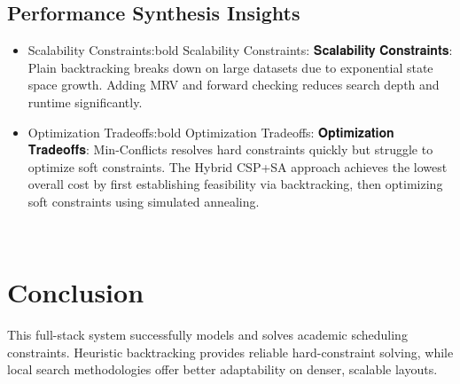 \documentclass[11pt,a4paper]{article}
\begin{document}
\subsection{Performance Synthesis Insights}
\begin{itemize}
\item 

Scalability Constraints:bold Scalability Constraints:
𝐒𝐜𝐚𝐥𝐚𝐛𝐢𝐥𝐢𝐭𝐲 𝐂𝐨𝐧𝐬𝐭𝐫𝐚𝐢𝐧𝐭𝐬:
 Plain backtracking breaks down on large datasets due to exponential state space growth. Adding MRV and forward checking reduces search depth and runtime significantly.
\item 

Optimization Tradeoffs:bold Optimization Tradeoffs:
𝐎𝐩𝐭𝐢𝐦𝐢𝐳𝐚𝐭𝐢𝐨𝐧 𝐓𝐫𝐚𝐝𝐞𝐨𝐟𝐟𝐬:
 Min-Conflicts resolves hard constraints quickly but struggle to optimize soft constraints. The Hybrid CSP+SA approach achieves the lowest overall cost by first establishing feasibility via backtracking, then optimizing soft constraints using simulated annealing.
\end{itemize} 

\section{Conclusion}
This full-stack system successfully models and solves academic scheduling constraints. Heuristic backtracking provides reliable hard-constraint solving, while local search methodologies offer better adaptability on denser, scalable layouts.
\end{document}
